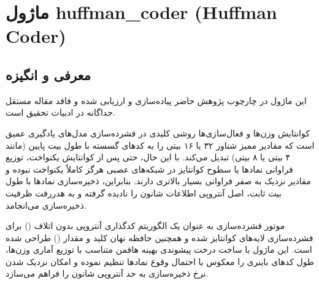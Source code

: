 \section{ماژول huffman\_coder (Huffman Coder)}
\label{sec:module_huffman_coder}

\subsection{معرفی و انگیزه}
این ماژول در چارچوب پژوهش حاضر پیاده‌سازی و ارزیابی شده و فاقد مقاله مستقل جداگانه در ادبیات تحقیق است.

کوانتایش وزن‌ها و فعال‌سازی‌ها روشی کلیدی در فشرده‌سازی مدل‌های یادگیری عمیق است که مقادیر ممیز شناور ۳۲ یا ۱۶ بیتی را به کدهای گسسته با طول بیت پایین (مانند ۴ بیتی یا ۸ بیتی) تبدیل می‌کند. با این حال، حتی پس از کوانتایش یکنواخت، توزیع فراوانی نمادها یا سطوح کوانتایز در شبکه‌های عصبی هرگز کاملاً یکنواخت نبوده و مقادیر نزدیک به صفر فراوانی بسیار بالاتری دارند. بنابراین، ذخیره‌سازی نمادها با طول بیت ثابت، اصل آنتروپی اطلاعات شانون را نادیده گرفته و به هدررفت ظرفیت ذخیره‌سازی می‌انجامد.

موتور فشرده‌سازی  به عنوان یک الگوریتم کدگذاری آنتروپی بدون اتلاف () برای فشرده‌سازی لایه‌های کوانتایز شده و همچنین حافظه نهان کلید و مقدار () طراحی شده است. این ماژول با ساخت درخت پیشوندی بهینه هافمن متناسب با توزیع آماری وزن‌ها، طول کدهای باینری را معکوس با احتمال وقوع نمادها تنظیم نموده و امکان نزدیک شدن نرخ ذخیره‌سازی به حد آنتروپی شانون را فراهم می‌سازد.

